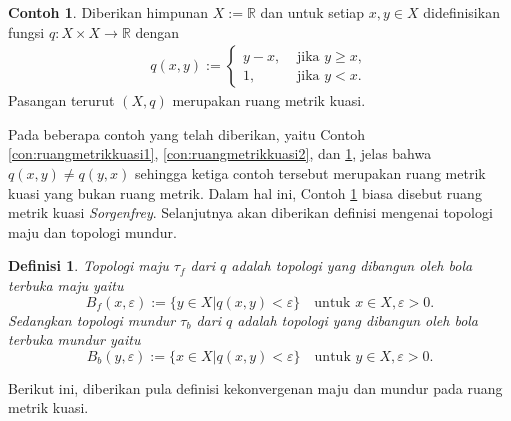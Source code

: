 \documentclass[journal]{IEEEtran}
\newtheorem{defn}{Definisi}[section]
\theoremstyle{definition}
\newtheorem{con}{Contoh}[section]
\theoremstyle{definition}
\theoremstyle{plain}
\newcommand{\R}{\mathbb{R}}
\begin{document}
\begin{con}\label{con:ruangmetrikkuasi3}
    \cite{JuliaCollins2007} Diberikan himpunan $X:=\R$ dan untuk setiap $x,y\in X$ didefinisikan fungsi $q:X\times X\rightarrow \R$ dengan 
    \begin{align}
        q(x,y) := \begin{cases}
        y-x, &\text{ jika } y\geq x,\\
        1, &\text{ jika } y<x.
        \end{cases} \label{fungsicon:ruangmetrikkuasi3}
    \end{align}
    Pasangan terurut $(X,q)$ merupakan ruang metrik kuasi.
\end{con}
Pada beberapa contoh yang telah diberikan, yaitu Contoh \ref{con:ruangmetrikkuasi1}, \ref{con:ruangmetrikkuasi2}, dan \ref{con:ruangmetrikkuasi3}, jelas bahwa $q(x,y)\neq q(y,x)$ sehingga ketiga contoh tersebut merupakan ruang metrik kuasi yang bukan ruang metrik. Dalam hal ini, Contoh \ref{con:ruangmetrikkuasi3} biasa disebut ruang metrik kuasi \textit{Sorgenfrey}. Selanjutnya akan diberikan definisi mengenai topologi maju dan topologi mundur.
\begin{defn}\label{def:topologimaju}
    \cite{JuliaCollins2007} Topologi maju $\tau_f$ dari $q$ adalah topologi yang dibangun oleh bola terbuka maju yaitu
    \begin{equation}
        B_f(x,\varepsilon) := \{y\in X\big|q(x,y)<\varepsilon\} \quad \text{untuk }x\in X, \varepsilon>0.
    \end{equation}
    Sedangkan topologi mundur $\tau_b$ dari $q$ adalah topologi yang dibangun oleh bola terbuka mundur yaitu
    \begin{equation}
        B_b(y,\varepsilon) := \{x\in X\big|q(x,y)<\varepsilon\} \quad \text{untuk }y\in X, \varepsilon>0.
    \end{equation}
\end{defn}
Berikut ini, diberikan pula definisi kekonvergenan maju dan mundur pada ruang metrik kuasi.
\end{document}
